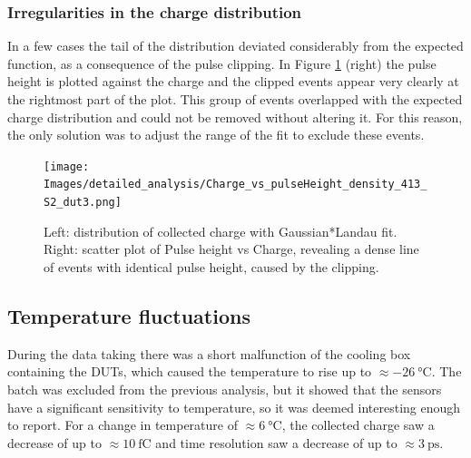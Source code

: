 \subsubsection{Irregularities in the charge distribution}\label{subsec:charge_irregularities}

In a few cases the tail of the distribution deviated considerably from the expected function, as a consequence of the pulse clipping. In Figure \ref{fig:charge_vs_pulseHeight_for_clipping} (right) the pulse height is plotted against the charge and the clipped events appear very clearly at the rightmost part of the plot. This group of events overlapped with the expected charge distribution and could not be removed without altering it. For this reason, the only solution was to adjust the range of the fit to exclude these events.

\begin{figure}[h!tbp]
    \centering
    \texttt{[image: Images/detailed\_analysis/Charge\_vs\_pulseHeight\_density\_413\_S2\_dut3.png]}
    \captionsetup{width=\captionwidth}
    \caption{Left: distribution of collected charge with Gaussian*Landau fit. \\
    Right: scatter plot of Pulse height vs Charge, revealing a dense line of events with identical pulse height, caused by the clipping.}
    \label{fig:charge_vs_pulseHeight_for_clipping}
\end{figure}

\FloatBarrier

\subsection{Temperature fluctuations}\label{sec:temperature_fluctuations}

During the data taking there was a short malfunction of the cooling box containing the DUTs, which caused the temperature to rise up to \(\approx\qty{-26}{\degreeCelsius}\). The  batch was excluded from the previous analysis, but it showed that the sensors have a significant sensitivity to temperature, so it was deemed interesting enough to report. For a change in temperature of \(\approx\qty{6}{\degreeCelsius}\), the collected charge saw a decrease of up to \(\approx\qty{10}{\femto\coulomb}\) and time resolution saw a decrease of up to \(\approx\qty{3}{\pico\second}\).

